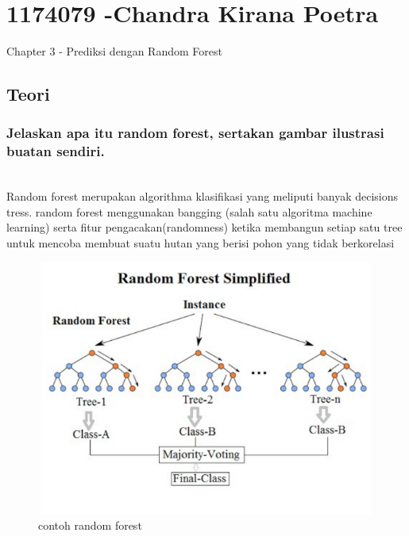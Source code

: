 \section{1174079 -Chandra Kirana Poetra}
Chapter 3 - Prediksi dengan Random Forest
\subsection{Teori}
\subsubsection{ Jelaskan apa itu random forest, sertakan gambar ilustrasi buatan sendiri.}
\hfill\\
Random forest merupakan algorithma klasifikasi yang meliputi banyak decisions tress. random forest menggunakan bangging (salah satu algoritma machine learning) serta fitur pengacakan(randomness) ketika membangun setiap satu tree untuk mencoba membuat suatu hutan yang berisi pohon yang tidak berkorelasi

\begin{figure}[H]
	\centering
	\includegraphics[width=12cm]{figures/1174079/3/randomforest.png}
	\caption{contoh random forest}
\end{figure}


